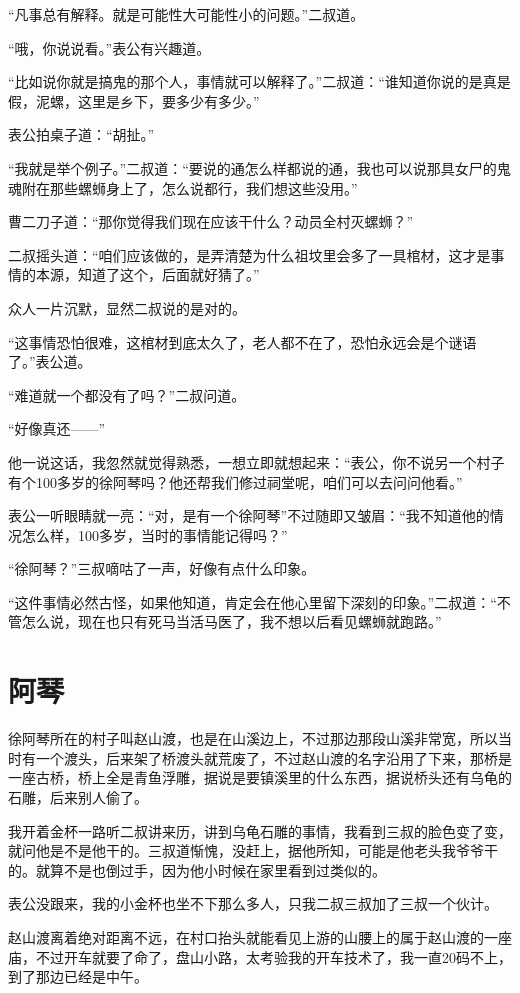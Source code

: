 “凡事总有解释。就是可能性大可能性小的问题。”二叔道。

“哦，你说说看。”表公有兴趣道。

“比如说你就是搞鬼的那个人，事情就可以解释了。”二叔道：“谁知道你说的是真是假，泥螺，这里是乡下，要多少有多少。”

表公拍桌子道：“胡扯。”

“我就是举个例子。”二叔道：“要说的通怎么样都说的通，我也可以说那具女尸的鬼魂附在那些螺蛳身上了，怎么说都行，我们想这些没用。”

曹二刀子道：“那你觉得我们现在应该干什么？动员全村灭螺蛳？”

二叔摇头道：“咱们应该做的，是弄清楚为什么祖坟里会多了一具棺材，这才是事情的本源，知道了这个，后面就好猜了。”

众人一片沉默，显然二叔说的是对的。

“这事情恐怕很难，这棺材到底太久了，老人都不在了，恐怕永远会是个谜语了。”表公道。

“难道就一个都没有了吗？”二叔问道。

“好像真还——”

他一说这话，我忽然就觉得熟悉，一想立即就想起来：“表公，你不说另一个村子有个100多岁的徐阿琴吗？他还帮我们修过祠堂呢，咱们可以去问问他看。”

表公一听眼睛就一亮：“对，是有一个徐阿琴”不过随即又皱眉：“我不知道他的情况怎么样，100多岁，当时的事情能记得吗？”

“徐阿琴？”三叔嘀咕了一声，好像有点什么印象。

“这件事情必然古怪，如果他知道，肯定会在他心里留下深刻的印象。”二叔道：“不管怎么说，现在也只有死马当活马医了，我不想以后看见螺蛳就跑路。”

\chapter{阿琴}

徐阿琴所在的村子叫赵山渡，也是在山溪边上，不过那边那段山溪非常宽，所以当时有一个渡头，后来架了桥渡头就荒废了，不过赵山渡的名字沿用了下来，那桥是一座古桥，桥上全是青鱼浮雕，据说是要镇溪里的什么东西，据说桥头还有乌龟的石雕，后来别人偷了。

我开着金杯一路听二叔讲来历，讲到乌龟石雕的事情，我看到三叔的脸色变了变，就问他是不是他干的。三叔道惭愧，没赶上，据他所知，可能是他老头我爷爷干的。就算不是也倒过手，因为他小时候在家里看到过类似的。

表公没跟来，我的小金杯也坐不下那么多人，只我二叔三叔加了三叔一个伙计。

赵山渡离着绝对距离不远，在村口抬头就能看见上游的山腰上的属于赵山渡的一座庙，不过开车就要了命了，盘山小路，太考验我的开车技术了，我一直20码不上，到了那边已经是中午。


